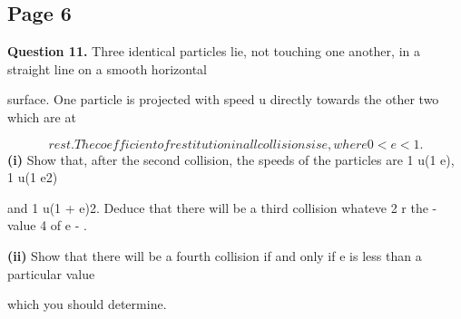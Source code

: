 \documentclass[12pt]{article}
\begin{document}
\subsection*{Page 6}
\begin{flushleft}
\bigskip\textbf{Question 11.} Three identical particles lie, not touching one another, in a straight line on a smooth horizontal\par
surface. One particle is projected with speed u directly towards the other two which are at\par
\[rest. The coefficient of restitution in all collisions is e, where 0 < e < 1 .\]
\textbf{(i)} Show that, after the second collision, the speeds of the particles are 1 u(1 e), 1 u(1 e2)\par
and 1 u(1 + e)2. Deduce that there will be a third collision whateve 2 r the - value 4 of e - .\par
\textbf{(ii)} Show that there will be a fourth collision if and only if e is less than a particular value\par
which you should determine.\par
\end{flushleft}
\end{document}

